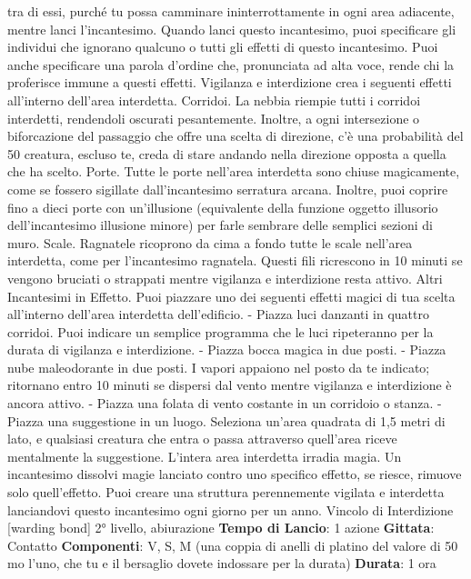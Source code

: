 \begin{multicols}{2}
tra di essi, purché tu possa camminare
ininterrottamente in ogni area adiacente, mentre lanci
l’incantesimo.
Quando lanci questo incantesimo, puoi specificare gli
individui che ignorano qualcuno o tutti gli effetti di
questo incantesimo. Puoi anche specificare una parola
d’ordine che, pronunciata ad alta voce, rende chi la
proferisce immune a questi effetti.
Vigilanza e interdizione crea i seguenti effetti all’interno
dell’area interdetta.
Corridoi. La nebbia riempie tutti i corridoi interdetti,
rendendoli oscurati pesantemente. Inoltre, a ogni
intersezione o biforcazione del passaggio che offre una
scelta di direzione, c’è una probabilità del 50%
creatura, escluso te, creda di stare andando nella
direzione opposta a quella che ha scelto.
Porte. Tutte le porte nell’area interdetta sono chiuse
magicamente, come se fossero sigillate
dall’incantesimo serratura arcana. Inoltre, puoi coprire
fino a dieci porte con un’illusione (equivalente della
funzione oggetto illusorio dell’incantesimo illusione
minore) per farle sembrare delle semplici sezioni di
muro.
Scale. Ragnatele ricoprono da cima a fondo tutte le
scale nell’area interdetta, come per l’incantesimo
ragnatela. Questi fili ricrescono in 10 minuti se vengono
bruciati o strappati mentre vigilanza e interdizione resta
attivo.
Altri Incantesimi in Effetto. Puoi piazzare uno dei
seguenti effetti magici di tua scelta all’interno dell’area
interdetta dell’edificio.
- Piazza luci danzanti in quattro corridoi. Puoi indicare
un semplice programma che le luci ripeteranno per
la durata di vigilanza e interdizione.
- Piazza bocca magica in due posti.
- Piazza nube maleodorante in due posti. I vapori
appaiono nel posto da te indicato; ritornano entro 10
minuti se dispersi dal vento mentre vigilanza e
interdizione è ancora attivo.
- Piazza una folata di vento costante in un corridoio o
stanza.
- Piazza una suggestione in un luogo. Seleziona
un’area quadrata di 1,5 metri di lato, e qualsiasi
creatura che entra o passa attraverso quell’area
riceve mentalmente la suggestione.
L’intera area interdetta irradia magia. Un incantesimo
dissolvi magie lanciato contro uno specifico effetto, se
riesce, rimuove solo quell’effetto.
Puoi creare una struttura perennemente vigilata e
interdetta lanciandovi questo incantesimo ogni giorno
per un anno.
Vincolo di Interdizione
[warding bond]
2° livello, abiurazione
\textbf{Tempo di Lancio}: 1 azione
\textbf{Gittata}: Contatto
\textbf{Componenti}: V, S, M (una coppia di anelli di platino del
valore di 50 mo l’uno, che tu e il bersaglio dovete
indossare per la durata)
\textbf{Durata}: 1 ora

\end{multicols}
